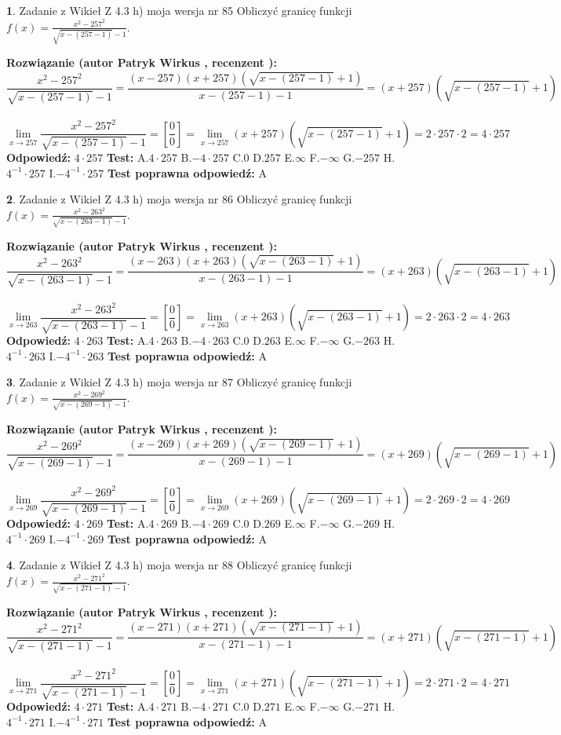 \documentclass[12pt, a4paper]{article}
\theoremstyle{definition} %
\newtheorem{zad}{}
\newcommand{\zadStart}[1]{\begin{zad}#1\newline}
\newcommand{\zadStop}{\end{zad}}
\newcommand{\rozwStart}[2]{\noindent \textbf{Rozwiązanie (autor #1 , recenzent #2): }\newline}
\newcommand{\rozwStop}{\newline}
\newcommand{\odpStart}{\noindent \textbf{Odpowiedź:}\newline}
\newcommand{\odpStop}{\newline}
\newcommand{\testStart}{\noindent \textbf{Test:}\newline}
\newcommand{\testStop}{\newline}
\newcommand{\kluczStart}{\noindent \textbf{Test poprawna odpowiedź:}\newline}
\newcommand{\kluczStop}{\newline}
\begin{document}
\zadStart{Zadanie z Wikieł Z 4.3 h) moja wersja nr 85}
Obliczyć granicę funkcji $f(x)=\frac{x^{2} - 257^{2}}{\sqrt{x-(257-1)}-1}$.
\zadStop
\rozwStart{Patryk Wirkus}{}
$$\frac{x^{2} - 257^{2}}{\sqrt{x-(257-1)}-1}=\frac{(x-257)(x+257)(\sqrt{x-(257-1)}+1)}{x-(257-1)-1}=(x+257)(\sqrt{x-(257-1)}+1)$$
\\
$$\lim\limits_{x\to 257}\frac{x^{2} - 257^{2}}{\sqrt{x-(257-1)}-1}=[\frac{0}{0}]=
\lim\limits_{x\to 257}(x+257)(\sqrt{x-(257-1)}+1) = 2\cdot257 \cdot 2 = 4 \cdot 257$$
\rozwStop
\odpStart
$4\cdot257$
\odpStop
\testStart
A.$4\cdot257$
B.$-4\cdot257$
C.$0$
D.$257$
E.$\infty$
F.$-\infty$
G.$-257$
H.$4^{-1}\cdot257$
I.$-4^{-1}\cdot257$
\testStop
\kluczStart
A
\kluczStop



\zadStart{Zadanie z Wikieł Z 4.3 h) moja wersja nr 86}
Obliczyć granicę funkcji $f(x)=\frac{x^{2} - 263^{2}}{\sqrt{x-(263-1)}-1}$.
\zadStop
\rozwStart{Patryk Wirkus}{}
$$\frac{x^{2} - 263^{2}}{\sqrt{x-(263-1)}-1}=\frac{(x-263)(x+263)(\sqrt{x-(263-1)}+1)}{x-(263-1)-1}=(x+263)(\sqrt{x-(263-1)}+1)$$
\\
$$\lim\limits_{x\to 263}\frac{x^{2} - 263^{2}}{\sqrt{x-(263-1)}-1}=[\frac{0}{0}]=
\lim\limits_{x\to 263}(x+263)(\sqrt{x-(263-1)}+1) = 2\cdot263 \cdot 2 = 4 \cdot 263$$
\rozwStop
\odpStart
$4\cdot263$
\odpStop
\testStart
A.$4\cdot263$
B.$-4\cdot263$
C.$0$
D.$263$
E.$\infty$
F.$-\infty$
G.$-263$
H.$4^{-1}\cdot263$
I.$-4^{-1}\cdot263$
\testStop
\kluczStart
A
\kluczStop



\zadStart{Zadanie z Wikieł Z 4.3 h) moja wersja nr 87}
Obliczyć granicę funkcji $f(x)=\frac{x^{2} - 269^{2}}{\sqrt{x-(269-1)}-1}$.
\zadStop
\rozwStart{Patryk Wirkus}{}
$$\frac{x^{2} - 269^{2}}{\sqrt{x-(269-1)}-1}=\frac{(x-269)(x+269)(\sqrt{x-(269-1)}+1)}{x-(269-1)-1}=(x+269)(\sqrt{x-(269-1)}+1)$$
\\
$$\lim\limits_{x\to 269}\frac{x^{2} - 269^{2}}{\sqrt{x-(269-1)}-1}=[\frac{0}{0}]=
\lim\limits_{x\to 269}(x+269)(\sqrt{x-(269-1)}+1) = 2\cdot269 \cdot 2 = 4 \cdot 269$$
\rozwStop
\odpStart
$4\cdot269$
\odpStop
\testStart
A.$4\cdot269$
B.$-4\cdot269$
C.$0$
D.$269$
E.$\infty$
F.$-\infty$
G.$-269$
H.$4^{-1}\cdot269$
I.$-4^{-1}\cdot269$
\testStop
\kluczStart
A
\kluczStop



\zadStart{Zadanie z Wikieł Z 4.3 h) moja wersja nr 88}
Obliczyć granicę funkcji $f(x)=\frac{x^{2} - 271^{2}}{\sqrt{x-(271-1)}-1}$.
\zadStop
\rozwStart{Patryk Wirkus}{}
$$\frac{x^{2} - 271^{2}}{\sqrt{x-(271-1)}-1}=\frac{(x-271)(x+271)(\sqrt{x-(271-1)}+1)}{x-(271-1)-1}=(x+271)(\sqrt{x-(271-1)}+1)$$
\\
$$\lim\limits_{x\to 271}\frac{x^{2} - 271^{2}}{\sqrt{x-(271-1)}-1}=[\frac{0}{0}]=
\lim\limits_{x\to 271}(x+271)(\sqrt{x-(271-1)}+1) = 2\cdot271 \cdot 2 = 4 \cdot 271$$
\rozwStop
\odpStart
$4\cdot271$
\odpStop
\testStart
A.$4\cdot271$
B.$-4\cdot271$
C.$0$
D.$271$
E.$\infty$
F.$-\infty$
G.$-271$
H.$4^{-1}\cdot271$
I.$-4^{-1}\cdot271$
\testStop
\kluczStart
A
\kluczStop
\end{document}
